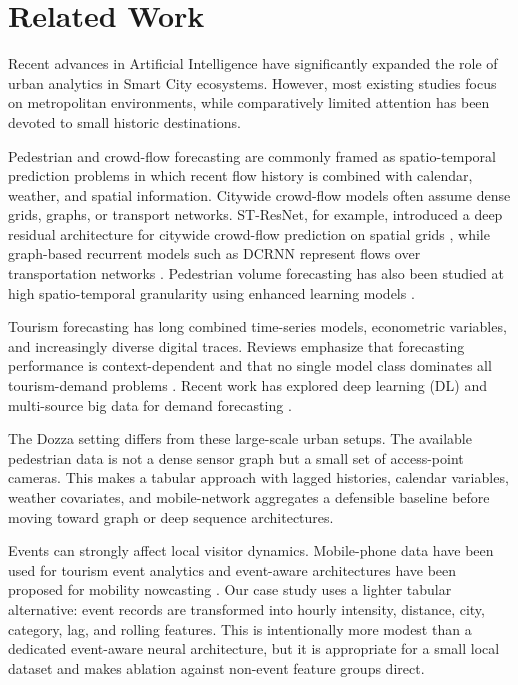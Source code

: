 \section{Related Work}
\label{sec:related}
Recent advances in Artificial Intelligence have significantly expanded the role of urban analytics in Smart City ecosystems. However, most existing studies focus on metropolitan environments, while comparatively limited attention has been devoted to small historic destinations.

Pedestrian and crowd-flow forecasting are commonly framed as spatio-temporal
prediction problems in which recent flow history is combined with calendar,
weather, and spatial information. Citywide crowd-flow models often assume dense
grids, graphs, or transport networks. ST-ResNet, for example, introduced a
deep residual architecture for citywide crowd-flow prediction on spatial grids
\cite{Zhang2017STResNet}, while graph-based recurrent models such as DCRNN
represent flows over transportation networks \cite{Li2018DCRNN}. Pedestrian
volume forecasting has also been studied at high spatio-temporal granularity
using enhanced learning models \cite{Jiang2022PedestrianGranularity}.

Tourism forecasting has long combined time-series models, econometric variables,
and increasingly diverse digital traces. Reviews emphasize that forecasting
performance is context-dependent and that no single model class dominates all
tourism-demand problems \cite{Song2019TourismDemandReview}. Recent work has
explored deep learning (DL) \cite{Law2019TourismDemandDeep} and multi-source big data
for demand forecasting \cite{Li2020TourismBigData}.

The Dozza setting differs from these large-scale urban setups. The available
pedestrian data is not a dense sensor graph but a small set of access-point
cameras. This makes a tabular approach with lagged histories, calendar variables,
weather covariates, and mobile-network aggregates a defensible baseline before
moving toward graph or deep sequence architectures. %

Events can strongly affect local visitor dynamics. Mobile-phone data have been
used for tourism event analytics \cite{Leng2021TourismEventAnalytics} and
event-aware architectures have been proposed for mobility nowcasting
\cite{Wang2022EASTNet}. Our case study uses a lighter tabular alternative:
event records are transformed into hourly intensity, distance, city, category,
lag, and rolling features. 
This is intentionally more modest
than a dedicated event-aware neural architecture, but it is appropriate for a
small local dataset and makes ablation against non-event feature groups direct.

